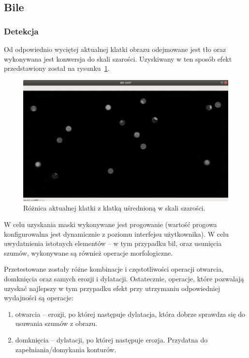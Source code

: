 \documentclass[12pt]{article}
\begin{document}
\clearpage

\subsection{Bile}

\subsubsection{Detekcja}

    Od odpowiednio wyciętej aktualnej klatki obrazu odejmowane jest tło  oraz wykonywana jest konwersja do skali szarości. Uzyskiwany w ten sposób efekt przedstawiony został na rysunku~\ref{bp_diff}.

    \begin{figure}[h]
        \centering
        \includegraphics[width=15cm]{./images/obrazki/bp/bp_diff.png}
        \caption{Różnica aktualnej klatki z klatką uśrednioną w skali szarości.}
        \label{bp_diff}
    \end{figure}


    W celu uzyskania maski wykonywane jest progowanie (wartość progowa konfigurowalna jest dynamicznie z poziomu interfejsu użytkownika). W celu uwydatnienia istotnych elementów – w tym przypadku bil, oraz usunięcia szumów, wykonywane są również operacje morfologiczne.
    \vspace{0.5cm}
    
    Przetestowane zostały różne kombinacje i częstotliwości operacji otwarcia, domknięcia oraz samych erozji i dylatacji. Ostatecznie, operacje, które pozwalają uzyskać najlepszy w tym przypadku efekt przy utrzymaniu odpowiedniej wydajności są operacje:

    \begin{enumerate}
        \item otwarcia – erozji, po której następuje dylatacja, która dobrze sprawdza się do usuwania szumów z obrazu.
        \item domknięcia – dylatacji, po której następuje erozja. Przydatna do zapełniania/domykania konturów.
    \end{enumerate}
\end{document}
